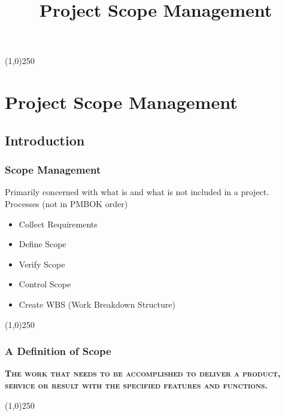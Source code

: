 



\title[Project Management \& BIM]{Project Scope Management}
%


%

\tableofcontents
\newpage



\begin{frame}
\titlepage
\end{frame}\begin{center}\line(1,0){250}\end{center}
%
%


\section{Project Scope Management}

\subsection{Introduction}



\begin{frame}
\frametitle{Scope Management}
Primarily concerned with what is and what is not included in a project.\\
Processes (not in PMBOK order)
\begin{itemize}
 	\item Collect Requirements
 	\item Define Scope
 	\item Verify Scope
 	\item Control Scope
 	\item Create WBS (Work Breakdown Structure)
\end{itemize}
\end{frame}\begin{center}\line(1,0){250}\end{center}



\begin{frame}
\frametitle{A Definition of Scope}
\textbf{\textsc{The work that needs to be accomplished to deliver a product, service or result with the specified features and functions.}}
\end{frame}\begin{center}\line(1,0){250}\end{center}



